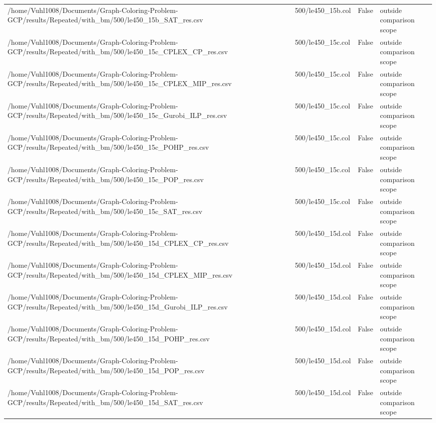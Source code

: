 \begin{table}[htbp]
\begin{tabular}{llll}
/home/Vuhl1008/Documents/Graph-Coloring-Problem-GCP/results/Repeated/with\_bm/500/le450\_15b\_SAT\_res.csv & 500/le450\_15b.col & False & outside comparison scope \\
/home/Vuhl1008/Documents/Graph-Coloring-Problem-GCP/results/Repeated/with\_bm/500/le450\_15c\_CPLEX\_CP\_res.csv & 500/le450\_15c.col & False & outside comparison scope \\
/home/Vuhl1008/Documents/Graph-Coloring-Problem-GCP/results/Repeated/with\_bm/500/le450\_15c\_CPLEX\_MIP\_res.csv & 500/le450\_15c.col & False & outside comparison scope \\
/home/Vuhl1008/Documents/Graph-Coloring-Problem-GCP/results/Repeated/with\_bm/500/le450\_15c\_Gurobi\_ILP\_res.csv & 500/le450\_15c.col & False & outside comparison scope \\
/home/Vuhl1008/Documents/Graph-Coloring-Problem-GCP/results/Repeated/with\_bm/500/le450\_15c\_POHP\_res.csv & 500/le450\_15c.col & False & outside comparison scope \\
/home/Vuhl1008/Documents/Graph-Coloring-Problem-GCP/results/Repeated/with\_bm/500/le450\_15c\_POP\_res.csv & 500/le450\_15c.col & False & outside comparison scope \\
/home/Vuhl1008/Documents/Graph-Coloring-Problem-GCP/results/Repeated/with\_bm/500/le450\_15c\_SAT\_res.csv & 500/le450\_15c.col & False & outside comparison scope \\
/home/Vuhl1008/Documents/Graph-Coloring-Problem-GCP/results/Repeated/with\_bm/500/le450\_15d\_CPLEX\_CP\_res.csv & 500/le450\_15d.col & False & outside comparison scope \\
/home/Vuhl1008/Documents/Graph-Coloring-Problem-GCP/results/Repeated/with\_bm/500/le450\_15d\_CPLEX\_MIP\_res.csv & 500/le450\_15d.col & False & outside comparison scope \\
/home/Vuhl1008/Documents/Graph-Coloring-Problem-GCP/results/Repeated/with\_bm/500/le450\_15d\_Gurobi\_ILP\_res.csv & 500/le450\_15d.col & False & outside comparison scope \\
/home/Vuhl1008/Documents/Graph-Coloring-Problem-GCP/results/Repeated/with\_bm/500/le450\_15d\_POHP\_res.csv & 500/le450\_15d.col & False & outside comparison scope \\
/home/Vuhl1008/Documents/Graph-Coloring-Problem-GCP/results/Repeated/with\_bm/500/le450\_15d\_POP\_res.csv & 500/le450\_15d.col & False & outside comparison scope \\
/home/Vuhl1008/Documents/Graph-Coloring-Problem-GCP/results/Repeated/with\_bm/500/le450\_15d\_SAT\_res.csv & 500/le450\_15d.col & False & outside comparison scope \\

\end{tabular}
\end{table}
